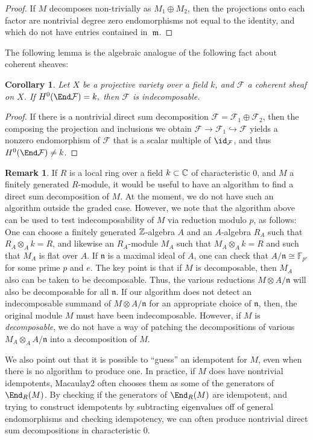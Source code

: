 \documentclass[12pt]{article}
\def\cF{\mathcal F}
\def\FF{\mathbb F}
\let\inc\hookrightarrow
\theoremstyle{theorem}
\numberwithin{thm}{section}
\newtheorem{cor}[thm]{Corollary}
\theoremstyle{definition}
\newtheorem{rem}[thm]{Remark}
\def\n{\mathfrak n}
\begin{document}
\begin{proof}
  If $M$ decomposes non-trivially as $M_1\oplus M_2$, then the projections onto each factor are nontrivial degree zero endomorphisms not equal to the identity, and which do not have entries contained in~$\mathfrak m$.
\end{proof}

The following lemma is the algebraic analogue of the following fact about coherent sheaves:

\begin{cor}
  Let $X$ be a projective variety over a field $k$, and $\cF$ a coherent sheaf on $X$.
  If $ H^0(\End \cF) = k, $ then $\cF$ is indecomposable.
\end{cor}

\begin{proof}
  If there is a nontrivial direct sum decomposition $\cF = \cF_1\oplus \cF_2$, then the composing the projection and inclusions we obtain $\cF\to \cF_1\inc \cF$ yields a nonzero endomorphism of $\cF$ that is a scalar multiple of $\id_\cF$, and thus $H^0(\End \cF) \neq k$.
\end{proof}

\begin{rem}
  \label{rem:char}
  If $R$ is a local ring over a field $k\subset \mathbb C$ of characteristic 0, and $M$ a finitely generated $R$-module, it would be useful to have an algorithm to find a direct sum decomposition of $M$.
  At the moment, we do not have such an algorithm outside the graded case.
  However, we note that the algorithm above can be used to test indecomposability of $M$ via reduction modulo $p$, as follows:
  One can choose a finitely generated $\mathbb Z$-algebra $A$ and an $A$-algebra $R_A$ such that $R_A\otimes _A k=R$, and likewise an $R_A$-module $M_A$ such that $M_A\otimes _A k = R$ and such that $M_A$ is flat over $A$. If $\n$ is a maximal ideal of $A$, one can check that $A/\n \cong \FF_{p^e}$ for some prime $p$ and $e$.
  The key point is that if $M$ is decomposable, then $M_A$ also can be taken to be decomposable. Thus, the various reductions  $M\otimes A/\n$ will also be decomposable for all $\n$.
  If our algorithm does not detect an indecomposable summand of $M\otimes A/\n$ for an appropriate choice of $\n$, then, the original module $M$ must have been indecomposable.
  However, if $M$ is \emph{decomposable}, we do not have a way of patching the decompositions of various $M_A\otimes_A A/\n$ into a decomposition of $M$.

  We also point out that it is possible to ``guess'' an idempotent for $M$, even when there is no algorithm to produce one. In practice, if $M$ does have nontrivial idempotents, Macaulay2 often chooses them as some of the generators of $\End_R(M)$. By checking if the generators of $\End_R(M)$ are idempotent, and trying to construct idempotents by subtracting eigenvalues off of general endomorphisms and checking idempotency, we can often produce nontrivial direct sum decompositions in characteristic 0.
\end{rem}
\end{document}

